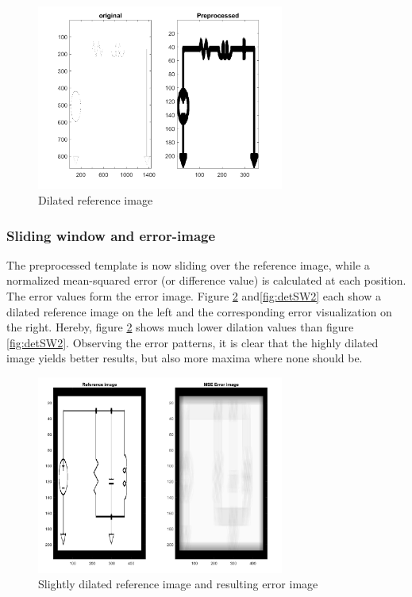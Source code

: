 \documentclass[10pt,twocolumn,letterpaper]{article}
\begin{document}
\begin{figure}[!ht]
\includegraphics[width = 3.2in]{img/detPP2.png}
\caption{Dilated reference image}
\label{fig:detPP2}
\end{figure}

\subsubsection*{Sliding window and error-image}

The preprocessed template is now sliding over the reference image, while a normalized mean-squared error (or difference value) is calculated at each position. The error values form the error image. Figure \ref{fig:detSW1} and\ref{fig:detSW2} each show a dilated reference image on the left and the corresponding error visualization on the right. Hereby, figure \ref{fig:detSW1} shows much lower dilation values than figure \ref{fig:detSW2}. Observing the error patterns, it is clear that the highly dilated image yields better results, but also more maxima where none should be.
\par

\begin{figure}[!ht]
\includegraphics[width = 3.2in]{img/detSW1.png}
\caption{Slightly dilated reference image and resulting error image}
\label{fig:detSW1}
\end{figure}
\par
\end{document}
